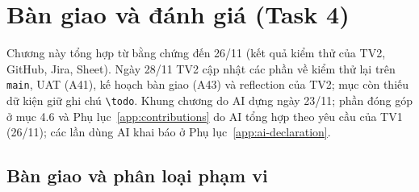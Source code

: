\chapter{Bàn giao và đánh giá (Task 4)}
\label{chap:task4}

Chương này tổng hợp từ bằng chứng đến 26/11 (kết quả kiểm thử của TV2, GitHub, Jira, Sheet). Ngày 28/11 TV2 cập nhật các phần về kiểm thử lại trên \texttt{main}, UAT (A41), kế hoạch bàn giao (A43) và reflection của TV2; mục còn thiếu dữ kiện giữ ghi chú \texttt{\textbackslash todo}. Khung chương do AI dựng ngày 23/11; phần đóng góp ở mục 4.6 và Phụ lục~\ref{app:contributions} do AI tổng hợp theo yêu cầu của TV1 (26/11); các lần dùng AI khai báo ở Phụ lục~\ref{app:ai-declaration}.

\section{Bàn giao và phân loại phạm vi}
\label{sec:4-1}

